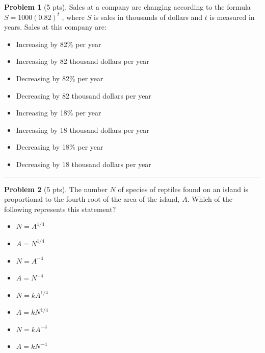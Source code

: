 \documentclass[12pt]{article}
\makeatletter
\theoremstyle{definition}
\newtheorem{problem}{Problem}
\newcommand*{\radiobutton}{%
  \@ifstar{\@radiobutton0}{\@radiobutton1}%
}
\newcommand*{\@radiobutton}[1]{%
  \begin{tikzpicture}
    \pgfmathsetlengthmacro\radius{height("X")/2}
    \draw[radius=\radius] circle;
    \ifcase#1 \fill[radius=.6*\radius] circle;\fi
  \end{tikzpicture}%
}
\makeatother
\begin{document}
\bigskip
\begin{problem}[5 pts]
  Sales at a company are changing according to the formula $S = 1000 (0.82)^t$ , where $S$ is sales in thousands of
  dollars and $t$ is measured in years. Sales at this company are: 
  \begin{itemize}
  \item[\radiobutton] Increasing by 82\% per year
  \item[\radiobutton] Increasing by 82 thousand dollars per year
  \item[\radiobutton] Decreasing by 82\% per year
  \item[\radiobutton] Decreasing by 82 thousand dollars per year
  \item[\radiobutton] Increasing by 18\% per year
  \item[\radiobutton] Increasing by 18 thousand dollars per year
  \item[\radiobutton] Decreasing by 18\% per year
  \item[\radiobutton] Decreasing by 18 thousand dollars per year
  \end{itemize} 
\end{problem}
\hrule

\begin{problem}[5 pts]
  The number $N$ of species of reptiles found on an island is proportional to the fourth root of the area of the island,
  $A$.  Which of the following represents this statement? 
  \begin{itemize}
  \item[\radiobutton] $N=A^{1/4}$
  \item[\radiobutton] $A=N^{1/4}$
  \item[\radiobutton] $N=A^{-4}$
  \item[\radiobutton] $A=N^{-4}$
  \item[\radiobutton] $N=kA^{1/4}$
  \item[\radiobutton] $A=kN^{1/4}$
  \item[\radiobutton] $N=kA^{-4}$
  \item[\radiobutton] $A=kN^{-4}$
  \end{itemize}
\end{problem}
\end{document}
